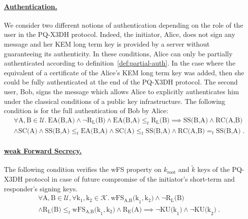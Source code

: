 \paragraph{\underline{Authentication.}} We consider two different notions of authentication depending on the role of the user in the PQ-X3DH protocol. Indeed, the initiator, Alice, does not sign any message and her KEM long term key is provided by a server without guaranteeing its authenticity. In these conditions, Alice can only be partially authenticated according to definition~\ref{def:partial-auth}. In the case where the equivalent of a certificate of the Alice's KEM long term key was added, then she could be fully authenticated at the end of the PQ-X3DH protocol. The second user, Bob, signs the message which allows Alice to explicitly authenticates him under the classical conditions of a public key infrastructure. The following condition is for the full authentication of Bob by Alice:
\begin{align*}
    & \forall \text{A},\text{B} \in \mathcal{U}. ~\text{EA(B,A)} \land \lnot \text{R}_\text{L}\text{(B)} \land \text{EA(B,A)} \leq_t \text{R}_\text{L}\text{(B)}
     \implies
     \text{SS(B,A)} \land \text{RC(A,B)} \\
    & \land \text{SC(A)} \land \text{SS(B,A)} \leq_t \text{EA(B,A)} \land \text{SC(A)} \leq_t \text{SS(B,A)} \land \text{RC(A,B)} =_t \text{SS(B,A)} \; .
\end{align*}

\paragraph{\underline{weak Forward Secrecy.}} The following condition verifies the wFS property on $k_\text{root}$ and $\tilde{k}$ keys of the PQ-X3DH protocol in case of future compromise of the initiator's short-term and responder's signing keys.
\begin{align*}
& \forall \text{A},\text{B} \in \mathcal{U}, \forall \text{k}_\text{1}, \text{k}_\text{2} \in \mathcal{K}.
~ \text{wFS}_{\text{A,B}}\text{(k}_\text{1}, \text{k}_\text{2}\text{)} \land \lnot \text{R}_\text{L}\text{(B)} \\
& \land \text{R}_\text{L}\text{(B)} \leq_t \text{wFS}_{\text{A,B}}\text{(k}_\text{1}, \text{k}_\text{2}\text{)} \land \text{R}_\text{E}\text{(A)}
\implies \lnot \text{KU}\text{(k}_\text{1}\text{)} \land \lnot \text{KU}\text{(k}_\text{2}\text{)} \; .
\end{align*}


